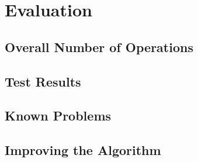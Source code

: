 
\section{Evaluation}
\label{algo:eval}

\subsection{Overall Number of Operations}
\label{algo:eval:O}

\subsection{Test Results}
\label{algo:eval:test}

\subsection{Known Problems}
\label{algo:eval:problems}

\subsection{Improving the Algorithm}
\label{algo:eval:improve}

